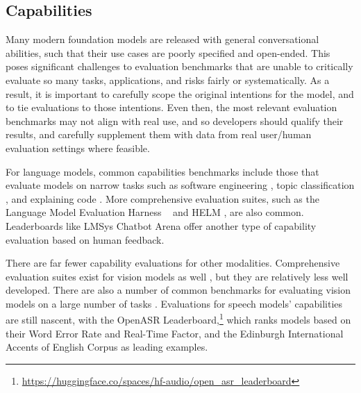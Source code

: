 \subsection{Capabilities}
\vspace{-2mm}


% 

Many modern foundation models are released with general conversational abilities, such that their use cases are poorly specified and open-ended.
This poses significant challenges to evaluation benchmarks that are unable to critically evaluate so many tasks, applications, and risks fairly or systematically.
As a result, it is important to carefully scope the original intentions for the model, and to tie evaluations to those intentions.
Even then, the most relevant evaluation benchmarks may not align with real use, and so developers should qualify their results, and carefully supplement them with data from real user/human evaluation settings where feasible.

For language models, common capabilities benchmarks include those that evaluate  models on narrow tasks such as software engineering \citep{jimenez2023swe}, topic classification \citep{adelani2023sib}, and explaining code \citep{muennighoff2023octopack}.  
More comprehensive evaluation suites, such as the Language Model Evaluation Harness ~\citep{eval-harness} and HELM \citep{liang2023holistic}, are also common. 
Leaderboards like LMSys Chatbot Arena \citep{zheng2023judging}  offer another type of capability evaluation based on human feedback.

There are far fewer capability evaluations for other modalities. 
Comprehensive evaluation suites exist for vision models as well \citep{lee2023holistic, awadalla2023openflamingo}, but they are relatively less well developed. 
There are also a number of common benchmarks for evaluating vision models on a large number of tasks \citep{gadre2023datacomp,liu2023mmbench, fu2023mme}.
Evaluations for speech models' capabilities are still nascent, with the OpenASR Leaderboard,\footnote{\url{https://huggingface.co/spaces/hf-audio/open_asr_leaderboard}} which ranks models based on their Word Error Rate and Real-Time Factor, and the Edinburgh International Accents of English Corpus \citep{sanabria2023edinburgh} as leading examples.

